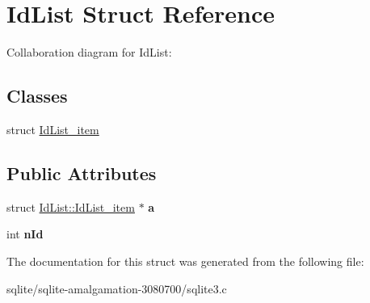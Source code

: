 \hypertarget{struct_id_list}{\section{Id\+List Struct Reference}
\label{struct_id_list}
}


Collaboration diagram for Id\+List\+:
\subsection*{Classes}
\begin{DoxyCompactItemize}
\item 
struct \hyperlink{struct_id_list_1_1_id_list__item}{Id\+List\+\_\+item}
\end{DoxyCompactItemize}
\subsection*{Public Attributes}
\begin{DoxyCompactItemize}
\item 
\hypertarget{struct_id_list_ad33082fd71286c1159711a1a3e979763}{struct \hyperlink{struct_id_list_1_1_id_list__item}{Id\+List\+::\+Id\+List\+\_\+item} $\ast$ {\bfseries a}}\label{struct_id_list_ad33082fd71286c1159711a1a3e979763}

\item 
\hypertarget{struct_id_list_afb785717796d8b3c72d1ae682dcb6ff0}{int {\bfseries n\+Id}}\label{struct_id_list_afb785717796d8b3c72d1ae682dcb6ff0}

\end{DoxyCompactItemize}


The documentation for this struct was generated from the following file\+:\begin{DoxyCompactItemize}
\item 
sqlite/sqlite-\/amalgamation-\/3080700/sqlite3.\+c\end{DoxyCompactItemize}
